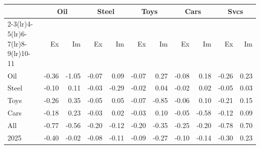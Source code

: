 \begin{tabular}{lrrrrrrrrrr}
\toprule
 & \multicolumn{2}{c}{Oil} & \multicolumn{2}{c}{Steel} & \multicolumn{2}{c}{Toys} & \multicolumn{2}{c}{Cars} & \multicolumn{2}{c}{Svcs} \\
\cmidrule(lr){2-3}\cmidrule(lr){4-5}\cmidrule(lr){6-7}\cmidrule(lr){8-9}\cmidrule(lr){10-11}
 & Ex & Im & Ex & Im & Ex & Im & Ex & Im & Ex & Im \\
\midrule
Oil & -0.36 & -1.05 & -0.07 & 0.09 & -0.07 & 0.27 & -0.08 & 0.18 & -0.26 & 0.23 \\
Steel & -0.10 & 0.11 & -0.03 & -0.29 & -0.02 & 0.04 & -0.02 & 0.02 & -0.05 & 0.03 \\
Toys & -0.26 & 0.35 & -0.05 & 0.05 & -0.07 & -0.85 & -0.06 & 0.10 & -0.21 & 0.15 \\
Cars & -0.18 & 0.23 & -0.03 & 0.02 & -0.03 & 0.10 & -0.05 & -0.58 & -0.12 & 0.09 \\
All & -0.77 & -0.56 & -0.20 & -0.12 & -0.20 & -0.35 & -0.25 & -0.20 & -0.78 & 0.70 \\
2025 & -0.40 & -0.02 & -0.08 & -0.11 & -0.09 & -0.27 & -0.10 & -0.14 & -0.30 & 0.23 \\
\bottomrule
\end{tabular}
